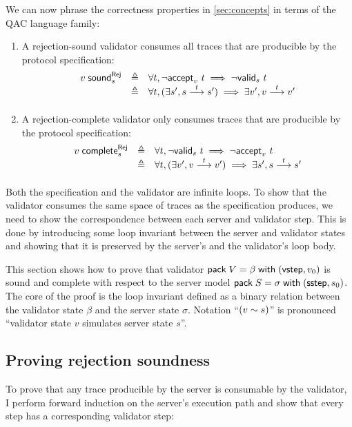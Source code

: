 We can now phrase the correctness properties in \autoref{sec:concepts} in terms
of the QAC language family:
\begin{enumerate}
  \item A rejection-sound validator consumes
    all traces that are producible by the protocol specification:
    \[\begin{array}{lrl}
      \rejSound v s&\triangleq&\forall t,\rejects v t\implies\invalid s t\\
      &\triangleq&\forall t,(\exists s',\behaves s t s')\implies\exists v',\behaves v t v'
    \end{array}\]
  \item A rejection-complete validator only
    consumes traces that are producible by the protocol specification:
    \[\begin{array}{lrl}
      \rejComplete v s&\triangleq&\forall t,\invalid s t\implies\rejects v t\\
      &\triangleq&\forall t,(\exists v',\behaves v t v')\implies\exists s',\behaves s t s'
    \end{array}\]
\end{enumerate}

Both the specification and the validator are infinite loops.  To show that the
validator consumes the same space of traces as the specification produces, we
need to show the correspondence between each server and validator step.  This is
done by introducing some loop invariant between the server and validator states
and showing that it is preserved by the server's and the validator's loop body.

This section shows how to prove that validator $\mathsf{pack}\;V=\beta\;\mathsf{with}\;(\mathsf{vstep},v_0)$
is sound and complete with respect to the server model
$\mathsf{pack}\;S=\sigma\;\mathsf{with}\;(\mathsf{sstep},s_0)$.  The core of the proof is the loop invariant
defined as a binary relation between the validator state $\beta$ and the server
state $\sigma$.  Notation ``$(v\sim s)$'' is pronounced ``validator state
$v$ simulates server state $s$''.

\subsection{Proving rejection soundness}
\label{sec:qac-soundness}
To prove that any trace producible by the server is consumable by the validator,
I perform forward induction on the server's execution path and show that every
step has a corresponding validator step:

